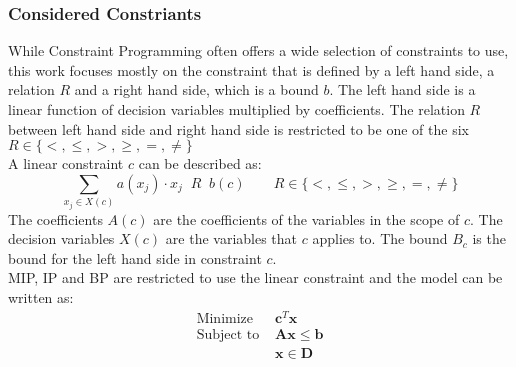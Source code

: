 \subsubsection{Considered Constriants }
While Constraint Programming often offers a wide selection of constraints to use, this work focuses mostly on the 
constraint \Linear that is defined by a left hand side, a relation $R$ and a 
right hand side, which is a bound $b$. The left hand side is a linear function of decision variables 
multiplied by coefficients. The relation $R$ between left hand side and right hand side is restricted to be one of 
the six $R \in \{<,\leq,>,\geq,=,\neq\}$ \\
A linear constraint $c$ can be described as: 
\begin{equation}
 \sum\limits_{x_j \in X(c)} a(x_j) \cdot x_j \;\; R \;\; b(c) \qquad R \in \{<,\leq,>,\geq,=,\neq\}%
\end{equation}
The coefficients $A(c)$ are the coefficients of the variables in the scope of $c$. The decision variables $X(c)$ are 
the variables that $c$ applies to. The bound $B_c$ is the bound for the left hand side in constraint $c$. \\
MIP, IP and BP are restricted to use the linear constraint and the model can be written as: 
\begin{align}
 \text{Minimize } & \mathbf{c}^T\mathbf{x} \nonumber \\ 
 \text{Subject to } &\mathbf{Ax} \leq \mathbf{b} \nonumber\\
 &\mathbf{x} \in \mathbf{D}
\end{align}
\fi






